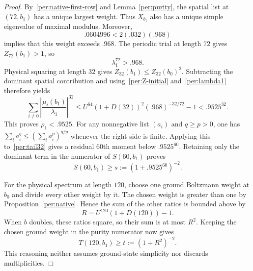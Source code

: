 \begin{proof}
By~\eqref{per:native-first-row} and Lemma~\ref{per:purity}, the spatial
list at $(72,b_1)$ has a unique largest weight.  Thus $X_{b_1}$ also
has a unique simple eigenvalue of maximal modulus.  Moreover,
\[
 .0604996<2(.032)(.968)
\]
implies that this weight exceeds $.968$.  The periodic trial at length
$72$ gives $Z_{72}(b_1)>1$, so
\begin{equation}\label{per:lambda1}
 \lambda_1^{72}>.968.
\end{equation}
Physical squaring at length $32$ gives
$Z_{32}(b_1)\le Z_{32}(b_0)^2$.  Subtracting the dominant spatial
contribution and using~\eqref{per:Z-initial} and~\eqref{per:lambda1}
therefore yields
\begin{equation}\label{per:tail32}
 \sum_{i\ne0}\left|\frac{\mu_i(b_1)}{\lambda_1}\right|^{32}
 \le U^{64}(1+D(32))^2(.968)^{-32/72}-1
 <.9525^{32}.
\end{equation}
This proves $\rho_1<.9525$.  For any nonnegative list $(a_i)$ and
$q\ge p>0$, one has
$\sum_i a_i^q\le(\sum_i a_i^p)^{q/p}$ whenever the right side is finite.
Applying this to~\eqref{per:tail32} gives a residual $60$th moment below
$.9525^{60}$.  Retaining only the dominant term in the numerator of
$S(60,b_1)$ proves
\begin{equation}\label{per:seed-s}
 S(60,b_1)\ge s:=(1+.9525^{60})^{-2}.
\end{equation}

For the physical spectrum at length $120$, choose one ground
Boltzmann weight at $b_0$ and divide every other weight by it.
The chosen weight is greater than one by Proposition~\ref{per:native}.
Hence the sum of the other ratios is bounded above by
\[
 R=U^{120}(1+D(120))-1.
\]
When $b$ doubles, these ratios square, so their sum is at most $R^2$.
Keeping the chosen ground weight in the purity numerator now gives
\begin{equation}\label{per:seed-t}
 T(120,b_1)\ge t:=(1+R^2)^{-2}.
\end{equation}
This reasoning neither assumes ground-state simplicity nor discards
multiplicities.


\end{proof}
